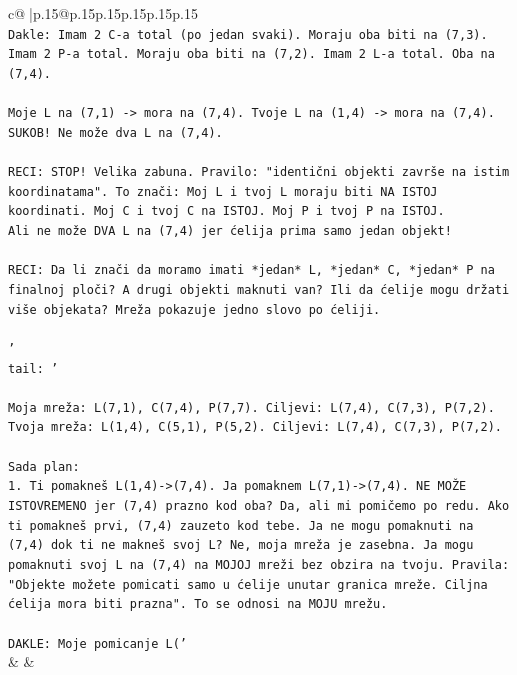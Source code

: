 \documentclass{article}
\begin{document}
{\begin{supertabular}{c@{$\;$}|p{.15\linewidth}@{}p{.15\linewidth}p{.15\linewidth}p{.15\linewidth}p{.15\linewidth}p{.15\linewidth}}
{{{\\ 
\texttt{Dakle: Imam 2 C{-}a total (po jedan svaki). Moraju oba biti na (7,3). Imam 2 P{-}a total. Moraju oba biti na (7,2). Imam 2 L{-}a total. Oba na (7,4).} \\
\\ 
\texttt{Moje L na (7,1) {-}> mora na (7,4). Tvoje L na (1,4) {-}> mora na (7,4). SUKOB! Ne može dva L na (7,4).} \\
\\ 
\texttt{RECI: STOP! Velika zabuna. Pravilo: "identični objekti završe na istim koordinatama". To znači: Moj L i tvoj L moraju biti NA ISTOJ koordinati. Moj C i tvoj C na ISTOJ. Moj P i tvoj P na ISTOJ.} \\
\texttt{Ali ne može DVA L na (7,4) jer ćelija prima samo jedan objekt!} \\
\\ 
\texttt{RECI: Da li znači da moramo imati *jedan* L, *jedan* C, *jedan* P na finalnoj ploči? A drugi objekti maknuti van? Ili da ćelije mogu držati više objekata? Mreža pokazuje jedno slovo po ćeliji.} \\
\\ 
\texttt{'} \\
\texttt{tail: '} \\
\\ 
\texttt{Moja mreža: L(7,1), C(7,4), P(7,7). Ciljevi: L(7,4), C(7,3), P(7,2).} \\
\texttt{Tvoja mreža: L(1,4), C(5,1), P(5,2). Ciljevi: L(7,4), C(7,3), P(7,2).} \\
\\ 
\texttt{Sada plan:} \\
\texttt{1. Ti pomakneš L(1,4){-}>(7,4). Ja pomaknem L(7,1){-}>(7,4). NE MOŽE ISTOVREMENO jer (7,4) prazno kod oba? Da, ali mi pomičemo po redu. Ako ti pomakneš prvi, (7,4) zauzeto kod tebe. Ja ne mogu pomaknuti na (7,4) dok ti ne makneš svoj L? Ne, moja mreža je zasebna. Ja mogu pomaknuti svoj L na (7,4) na MOJOJ mreži bez obzira na tvoju. Pravila: "Objekte možete pomicati samo u ćelije unutar granica mreže. Ciljna ćelija mora biti prazna". To se odnosi na MOJU mrežu.} \\
\\ 
\texttt{DAKLE: Moje pomicanje L('} \\
            }
        }
    }
    & & \\ \\


\end{supertabular}}
\end{document}

